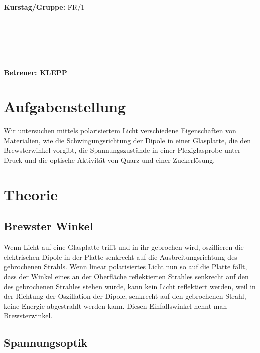 \documentclass{article}
\begin{document}
\begin{verbatim}


\end{verbatim}
			\begin{flushleft}
			\textbf{\Large{Kurstag/Gruppe:}} \Large{FR/1}
			\end{flushleft}

\begin{verbatim}






\end{verbatim}
			\begin{flushleft}
			\LARGE{\textbf{Betreuer:\Large{ KLEPP }}}		
			\end{flushleft}
			
\section{Aufgabenstellung}
Wir untersuchen mittels polarisiertem Licht verschiedene Eigenschaften von Materialien, wie die Schwingungsrichtung der Dipole in einer Glasplatte, die den Brewsterwinkel vorgibt, die Spannungszustände in einer Plexiglasprobe unter Druck und die optische Aktivität von Quarz und einer Zuckerlösung.

\section{Theorie}
\subsection{Brewster Winkel}
Wenn Licht auf eine Glasplatte trifft und in ihr gebrochen wird, oszillieren die elektrischen Dipole in der Platte senkrecht auf die Ausbreitungsrichtung des gebrochenen Strahls. Wenn linear polarisiertes Licht nun so auf die Platte fällt, dass der Winkel eines an der Oberfläche reflektierten Strahles senkrecht auf den des gebrochenen Strahles stehen würde, kann kein Licht reflektiert werden, weil in der Richtung der Oszillation der Dipole, senkrecht auf den gebrochenen Strahl, keine Energie abgestrahlt werden kann. Diesen Einfallswinkel nennt man Brewsterwinkel.
\subsection{Spannungsoptik}
\end{document}

